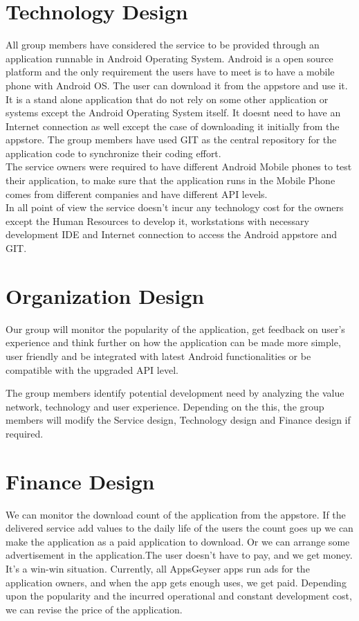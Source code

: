 \documentclass[10pt,a4paper]{report}
\begin{document}
\section{Technology Design}

All group members have considered the service to be provided through an application runnable in Android Operating System. Android is a open source platform and the only requirement the users have to meet is to have a mobile phone with Android OS. The user can download it from the appstore and use it. It is a stand alone application that do not rely on some other application or systems except the Android Operating System itself. It doesnt need to have an Internet connection as well except the case of downloading it initially from the appstore. The group members have used GIT as the central repository for the application code to synchronize their coding effort. \\

The service owners were required to have different Android Mobile phones to test their application, to make sure that the application runs in the Mobile Phone comes from different companies and have different API levels. \\

In all point of view the service doesn't incur any technology cost for the owners except the Human Resources to develop it, workstations with necessary development IDE and Internet connection to access the Android appstore and GIT.

\section{Organization Design}

Our group will monitor the popularity of the application, get feedback on user's experience and think further on how the application can be made more simple, user friendly and be integrated with latest Android functionalities or be compatible with the upgraded API level.

The group members identify potential development need by analyzing the value network, technology and user experience. Depending on the this, the group members will modify the Service design, Technology design and Finance design if required.

\section{Finance Design}
We can monitor the download count of the application from the appstore. If the delivered service add values to the daily life of the users the count goes up we can make the application as a paid application to download. Or we can arrange some advertisement in the application.The user doesn’t have to pay, and we get money. It’s a win-win situation. Currently, all AppsGeyser apps run ads for the application owners, and when the app gets enough uses, we get paid. Depending upon the popularity and the incurred operational and constant development cost, we can revise the price of the application.
\end{document}
